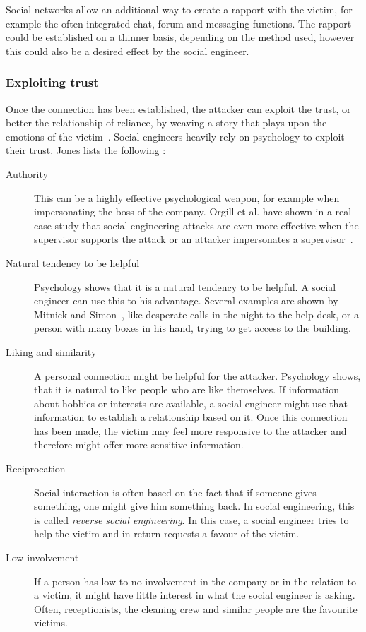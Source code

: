 Social networks allow an additional way to create a rapport with the victim,
for example the often integrated chat, forum and messaging functions. The
rapport could be established on a thinner basis, depending on the method used,
however this could also be a desired effect by the social engineer.


\subsubsection{Exploiting trust}

Once the connection has been established, the attacker can exploit the trust,
or better the relationship of reliance, by \glqq{}weaving a story that plays
upon the emotions of the victim\grqq{}~\cite{thornburgh2004}. Social engineers
heavily rely on psychology to exploit their trust. Jones lists the following
\cite{jones2004}:

\begin{description}

\item[Authority] This can be a highly effective psychological weapon, for
  example when impersonating the boss of the company. Orgill et al. have
  shown in a real case study that social engineering attacks are even more
  effective when the supervisor supports the attack or an attacker
  impersonates a supervisor~\cite{orgill2004}.
\item[Natural tendency to be helpful] Psychology shows that it is a natural
  tendency to be helpful. A social engineer can use this to his advantage.
  Several examples are shown by Mitnick and Simon~\cite{mitnick2003}, like
  desperate calls in the night to the help desk, or a person with many boxes
  in his hand, trying to get access to the building.
\item[Liking and similarity] A personal connection might be helpful for the
  attacker. Psychology shows, that it is natural to like people who are like
  themselves. If information about hobbies or interests are available, a social
  engineer might use that information to establish a relationship based on 
  it. Once this connection has been made, the victim may feel more
  responsive to the attacker and therefore might offer more sensitive
  information.
\item[Reciprocation] Social interaction is often based on the fact that if
  someone gives something, one might give him something back. In social
  engineering, this is called \textit{reverse social engineering}. In this case, a
  social engineer tries to help the victim and in return requests a favour of
  the victim.
\item[Low involvement] If a person has low to no involvement in the company or
  in the relation to a victim, it might have little interest in what the social engineer is
  asking. Often, receptionists, the cleaning crew and similar people are the
  favourite victims.
\end{description}

